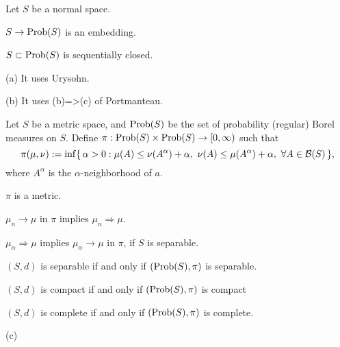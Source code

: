 \documentclass{../../large}
\begin{document}
\begin{prb}
Let $S$ be a normal space.
\begin{parts}
\item $S\to\operatorname{Prob}(S)$ is an embedding.
\item $S\subset\operatorname{Prob}(S)$ is sequentially closed.
\item %
\end{parts}
\end{prb}
\begin{pf}
(a)
It uses Urysohn.

(b)
It uses (b)=>(c) of Portmanteau.
\end{pf}


\begin{prb}
Let $S$ be a metric space, and $\operatorname{Prob}(S)$ be the set of probability (regular) Borel measures on $S$.
Define $\pi:\operatorname{Prob}(S)\times\operatorname{Prob}(S)\to[0,\infty)$ such that
\[\pi(\mu,\nu):=\inf\{\,\alpha>0:\mu(A)\le\nu(A^\alpha)+\alpha,\ \nu(A)\le\mu(A^\alpha)+\alpha,\ \forall A\in\cB(S)\,\},\]
where $A^\alpha$ is the $\alpha$-neighborhood of $a$.
\begin{parts}
\item $\pi$ is a metric.
\item $\mu_n\to\mu$ in $\pi$ implies $\mu_n\Rightarrow\mu$.
\item $\mu_\alpha\Rightarrow\mu$ implies $\mu_\alpha\to\mu$ in $\pi$, if $S$ is separable.
\item $(S,d)$ is separable if and only if $(\operatorname{Prob}(S),\pi)$ is separable.
\item $(S,d)$ is compact if and only if $(\operatorname{Prob}(S),\pi)$ is compact
\item $(S,d)$ is complete if and only if $(\operatorname{Prob}(S),\pi)$ is complete.
\end{parts}
\end{prb}
\begin{pf}
(c)
\end{pf}
\end{document}
